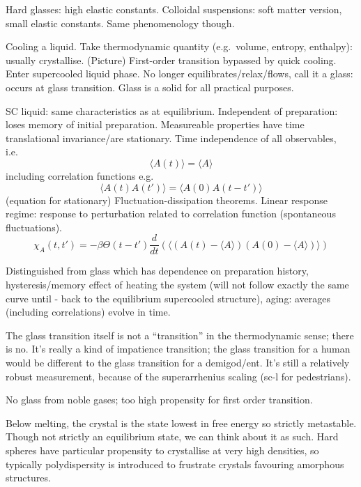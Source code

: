 Hard glasses: high elastic constants.
Colloidal suspensions: soft matter version, small elastic constants.
Same phenomenology though.

Cooling a liquid.
Take thermodynamic quantity (e.g.\ volume, entropy, enthalpy): usually crystallise.
(Picture)
First-order transition bypassed by quick cooling.
Enter supercooled liquid phase.
No longer equilibrates/relax/flows, call it a glass: occurs at glass transition.
Glass is a solid for all practical purposes.

SC liquid: same characteristics as at equilibrium.
Independent of preparation: loses memory of initial preparation.
Measureable properties have time translational invariance/are stationary.
Time independence of all observables, i.e.\
\begin{equation}
  \langle A(t) \rangle = \langle A \rangle
\end{equation}
including correlation functions e.g.\
\begin{equation}
  \langle A(t) A(t') \rangle = \langle A(0) A(t - t') \rangle
\end{equation}
(equation for stationary)
Fluctuation-dissipation theorems.
Linear response regime: response to perturbation related to correlation function (spontaneous fluctuations).
\begin{equation}
  \chi_A (t, t')
  =
  - \beta \Theta(t - t')
  \frac{d}{dt}
  \left(
  \bigg\langle
  (A(t) - \langle A \rangle)
  (A(0) - \langle A \rangle)
  \bigg\rangle
  \right)
\end{equation}

Distinguished from glass which has dependence on preparation history, hysteresis/memory effect of heating the system (will not follow exactly the same curve until - back to the equilibrium supercooled structure), aging: averages (including correlations) evolve in time.

The glass transition itself is not a ``transition'' in the thermodynamic sense; there is no.
It's really a kind of impatience transition; the glass transition for a human would be different to the glass transition for a demigod/ent.
It's still a relatively robust measurement, because of the superarrhenius scaling (sc-l for pedestrians).

No glass from noble gases; too high propensity for first order transition.

Below melting, the crystal is the state lowest in free energy so strictly metastable.
Though not strictly an equilibrium state, we can think about it as such.
Hard spheres have particular propensity to crystallise at very high densities, so typically polydispersity is introduced to frustrate crystals favouring amorphous structures.

